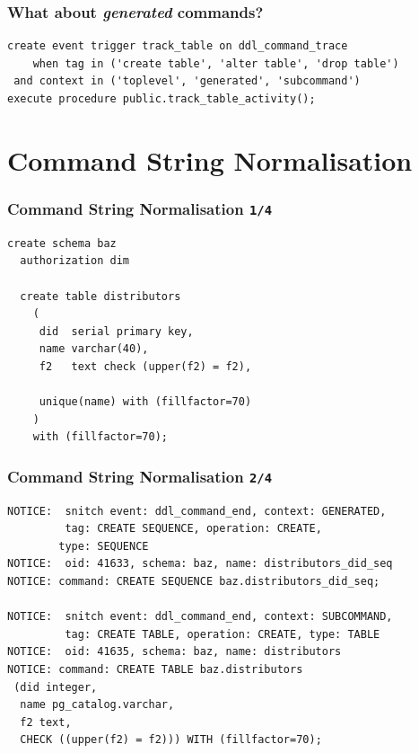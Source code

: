 \documentclass{beamer}
\begin{document}
\begin{frame}[fragile]
  \frametitle{What about \textit{generated} commands?}

  \vfill

\begin{verbatim}
create event trigger track_table on ddl_command_trace
    when tag in ('create table', 'alter table', 'drop table')
 and context in ('toplevel', 'generated', 'subcommand')
execute procedure public.track_table_activity();
\end{verbatim}
\end{frame}

\section{Command String Normalisation}

\begin{frame}[fragile]
  \frametitle{Command String Normalisation \texttt{1/4}}

  \vfill

\begin{verbatim}
create schema baz
  authorization dim

  create table distributors
    (
     did  serial primary key,
     name varchar(40),
     f2   text check (upper(f2) = f2),

     unique(name) with (fillfactor=70)
    )
    with (fillfactor=70);
\end{verbatim}
\end{frame}

\begin{frame}[fragile]
  \frametitle{Command String Normalisation \texttt{2/4}}

\begin{verbatim}
NOTICE:  snitch event: ddl_command_end, context: GENERATED,
         tag: CREATE SEQUENCE, operation: CREATE,
        type: SEQUENCE
NOTICE:  oid: 41633, schema: baz, name: distributors_did_seq
NOTICE: command: CREATE SEQUENCE baz.distributors_did_seq;

NOTICE:  snitch event: ddl_command_end, context: SUBCOMMAND,
         tag: CREATE TABLE, operation: CREATE, type: TABLE
NOTICE:  oid: 41635, schema: baz, name: distributors
NOTICE: command: CREATE TABLE baz.distributors
 (did integer,
  name pg_catalog.varchar, 
  f2 text,
  CHECK ((upper(f2) = f2))) WITH (fillfactor=70);
\end{verbatim}
\end{frame}
\end{document}
